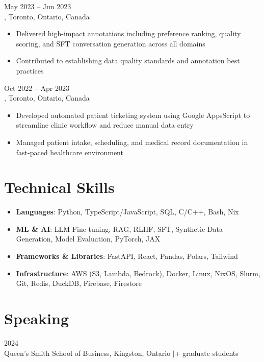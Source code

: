 \documentclass[letterpaper,10pt]{article}
\begin{document}
\hspace{0.15in}{\large\bfseries Data Quality Specialist} \hfill {\small May 2023 -- Jun 2023} \\
\hspace{0.15in}{\bfseries Cohere}, Toronto, Ontario, Canada
\vspace{-1pt}
\begin{itemize}[leftmargin=0.35in, itemsep=-1pt, topsep=1pt, labelsep=0.035in]
\item Delivered high-impact annotations including preference ranking, quality scoring, and SFT conversation generation across all domains
\item Contributed to establishing data quality standards and annotation best practices
\end{itemize}
\vspace{1pt}

\hspace{0.15in}{\large\bfseries Medical Assistant} \hfill {\small Oct 2022 -- Apr 2023} \\
\hspace{0.15in}{\bfseries P\&A Medical}, Toronto, Ontario, Canada
\vspace{-1pt}
\begin{itemize}[leftmargin=0.35in, itemsep=-1pt, topsep=1pt, labelsep=0.035in]
\item Developed automated patient ticketing system using Google AppsScript to streamline clinic workflow and reduce manual data entry
\item Managed patient intake, scheduling, and medical record documentation in fast-paced healthcare environment
\end{itemize}
\vspace{1pt}

\section{Technical Skills}

\vspace{-2pt}
\begin{itemize}[leftmargin=0.35in, itemsep=1pt, topsep=1pt, labelsep=0.035in]
\item \textbf{Languages}: Python, TypeScript/JavaScript, SQL, C/C++, Bash, Nix
\item \textbf{ML \& AI}: LLM Fine-tuning, RAG, RLHF, SFT, Synthetic Data Generation, Model Evaluation, PyTorch, JAX
\item \textbf{Frameworks \& Libraries}: FastAPI, React, Pandas, Polars, Tailwind
\item \textbf{Infrastructure}: AWS (S3, Lambda, Bedrock), Docker, Linux, NixOS, Slurm, Git, Redis, DuckDB, Firebase, Firestore
\end{itemize}

\section{Speaking}

\hspace{0.15in}{\bfseries Guest Lecturer on AI and Synthetic Data Generation for MMA Program} \hfill {\small 2024} \\
\hspace{0.15in}Queen's Smith School of Business, Kingston, Ontario \enspace$|$+ graduate students
\end{document}
